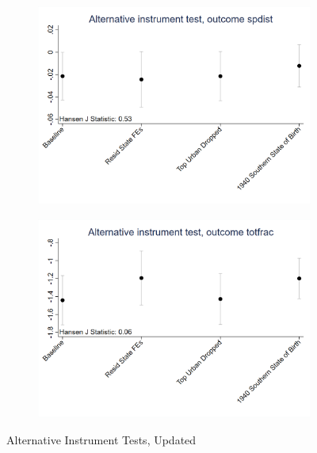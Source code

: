 \documentclass{article}
\begin{document}
\begin{figure}[htbp]
\begin{subfigure}{0.3\textwidth}
        \includegraphics[width=\linewidth]{exhibits/figures/exogeneity_tests/D16_alt_inst_pooled_spdist.png}
        \label{fig:sub6}
    \end{subfigure}
    \begin{subfigure}{0.3\textwidth}
        \includegraphics[width=\linewidth]{exhibits/figures/exogeneity_tests/D16_alt_inst_pooled_totfrac.png}
        \label{fig:sub4}
    \end{subfigure}
    \caption{Alternative Instrument Tests, Updated}
    \label{fig:all}
\end{figure}

\clearpage
\end{document}
